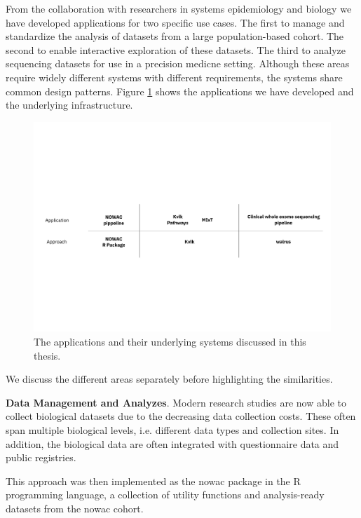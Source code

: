 From the collaboration with researchers in systems epidemiology and biology we
have developed applications for two specific use cases. The first to manage and
standardize the analysis of datasets from a large population-based cohort.  The
second to enable interactive exploration of these datasets.  The third to
analyze sequencing datasets for use in a precision medicne setting. Although
these areas require widely different systems with different requirements, the
systems share common design patterns.  Figure \ref{overview-fig} shows the
applications we have developed and the underlying infrastructure. 

\begin{figure}
\includegraphics[width=\textwidth]{figures/overall-arch.pdf}
    \caption{The applications and their underlying systems discussed in this
    thesis. } 
    \label{overview-fig}
\end{figure} 

We discuss the different areas separately before highlighting the similarities. 

\textbf{Data Management and Analyzes}. 
Modern research studies are now able to collect biological datasets due to the
decreasing data collection costs. These often span multiple biological levels,
i.e. different data types and collection sites. In addition, the biological data
are often integrated with questionnaire data and public registries. 

This approach was then implemented as the \gls{nowac} package in the R
programming language, a collection of utility functions and analysis-ready
datasets from the \gls{nowac} cohort. 

